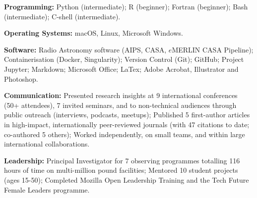  \vspace{-8pt}
\begin{cvpubs}
  \cvpub
    {
      \begin{cvlist}
      	\item {\textbf{Programming:} Python (intermediate); R (beginner); Fortran (beginner); Bash (intermediate); C-shell (intermediate).}
        \item{\textbf{Operating Systems:} macOS, Linux, Microsoft Windows.}
        \item {\textbf{Software:} Radio Astronomy software (AIPS, CASA, $e$MERLIN CASA Pipeline); Containerisation (Docker, Singularity); Version Control (Git); GitHub; Project Jupyter; Markdown; Microsoft Office; LaTex; Adobe Acrobat, Illustrator and Photoshop.}
        \item {\textbf{Communication:} Presented research insights at 9 international conferences (50+ attendees), 7 invited seminars, and to non-technical audiences through public outreach (interviews, podcasts, meetups); Published 5 first-author articles in high-impact, internationally peer-reviewed journals (with 47 citations to date; co-authored 5 others); Worked independently, on small teams, and within large international collaborations.}
        \item {\textbf{Leadership:} Principal Investigator for 7 observing programmes totalling 116 hours of time on multi-million pound facilities; Mentored 10 student projects (ages 15-50); Completed Mozilla Open Leadership Training and the Tech Future Female Leaders programme.}
      \end{cvlist}
    }
\end{cvpubs}